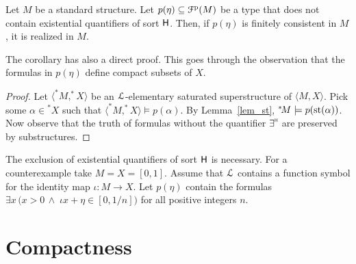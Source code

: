 \documentclass{amsproc}
\begin{document}
\begin{corollary}\label{corol_st}
  Let $M$ be a standard structure.
  Let $p(\eta)\subseteq{\EuScript F}^{\rm p}(M)$ be a type that does not contain existential quantifiers of sort ${\sf H}$.
  Then, if $p(\eta)$ is finitely consistent in $M$, it is realized in $M$.
 \end{corollary}
 
 The corollary has also a direct proof.
 This goes through the observation that the formulas in $p(\eta)$ define compact subsets of $X$.

 \begin{proof}
  Let $\langle ^*\!M,^*\!\!X\rangle$ be an ${\EuScript L}$-elementary saturated superstructure of $\langle M,X\rangle$.
  Pick some $\alpha\in{}^*\!\!X$ such that $\langle ^*\!M,^*\!\!X\rangle\models p(\alpha)$.
  By Lemma~\ref{lem_st}, $^*\!M\models p({\rm st}(\alpha))$.
  Now observe that the truth of formulas without the quantifier $\exists\raisebox{1.1ex}{\scaleto{\sf H}{.8ex}}$ are preserved by substructures.
 \end{proof}
 
 The exclusion of existential quantifiers of sort ${\sf H}$ is necessary.
 For a counterexample take $M=X=[0,1]$.
 Assume that ${\EuScript L}$ contains a function symbol for the identity map $\iota:M\to X$.
 Let $p(\eta)$ contain the formulas $\exists x\,\big(x>0\,\wedge\;\iota x+\eta\in[0,1/n]\big)$ for all positive integers $n$.



\section{Compactness}\label{compactness}
\end{document}
